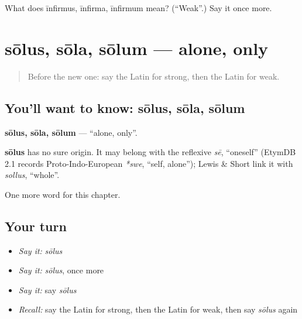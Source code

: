 \begin{tcolorbox}[breakable,colback=teal!4,colframe=teal!35!black,title={Before you move on}]
What does īnfirmus, īnfirma, īnfirmum mean? (\textquotedblleft{}Weak\textquotedblright{}.) Say it once more.
\end{tcolorbox}
\section[sōlus, sōla, sōlum]{sōlus, sōla, sōlum — alone, only}

\label{lesson:LA-C152-solus}



\begin{quote}
Before the new one: say the Latin for strong, then the Latin for weak.
\end{quote}

\subsection*{You'll want to know: sōlus, sōla, sōlum}
\textbf{sōlus, sōla, sōlum} — \textquotedblleft{}alone, only\textquotedblright{}.

\begin{cousinweb}
\textbf{sōlus} has no sure origin. It may belong with the reflexive \emph{sē}, \textquotedblleft{}oneself\textquotedblright{} (EtymDB 2.1 records Proto-Indo-European \emph{*swe}, \textquotedblleft{}self, alone\textquotedblright{}); Lewis \& Short link it with \emph{sollus}, \textquotedblleft{}whole\textquotedblright{}.
\end{cousinweb}

\begin{grammarlens}[title={What you've built}]
One more word for this chapter.
\end{grammarlens}

\subsection*{Your turn}
\begin{itemize}
\raggedright
  \item \emph{Say it:} \emph{sōlus}
  \item \emph{Say it:} \emph{sōlus}, once more
  \item \emph{Say it:} say \emph{sōlus}
  \item \emph{Recall:} say the Latin for strong, then the Latin for weak, then say \emph{sōlus} again
\end{itemize}

